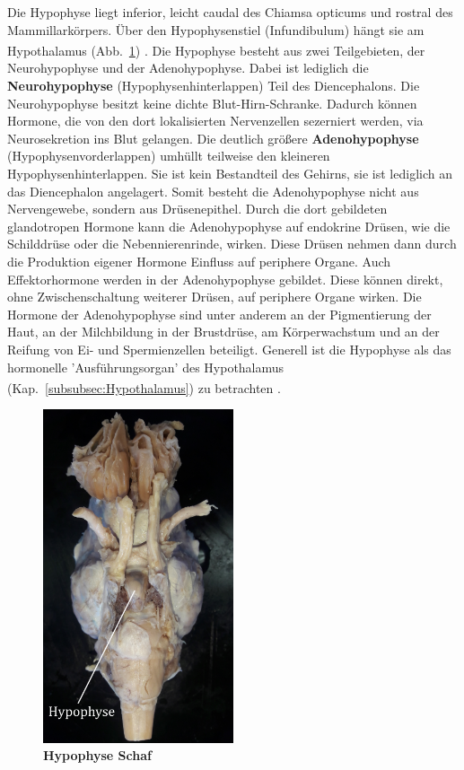 Die Hypophyse liegt inferior, leicht caudal des Chiamsa opticums und rostral des Mammillarkörpers. Über den Hypophysenstiel (Infundibulum) hängt sie am Hypothalamus (Abb.~\ref{fig:hypophyse}) \textsuperscript{\cite[Kap.~4]{trepel2011neuroanatomie}}. Die Hypophyse besteht aus zwei Teilgebieten, der Neurohypophyse und der Adenohypophyse. Dabei ist lediglich die \textbf{Neurohypophyse} (Hypophysenhinterlappen) Teil des Diencephalons. Die Neurohypophyse besitzt keine dichte Blut-Hirn-Schranke. Dadurch können Hormone, die von den dort lokalisierten Nervenzellen sezerniert werden, via Neurosekretion ins Blut gelangen. Die deutlich größere \textbf{Adenohypophyse} (Hypophysenvorderlappen) umhüllt teilweise den kleineren Hypophysenhinterlappen. Sie ist kein Bestandteil des Gehirns, sie ist lediglich an das Diencephalon angelagert. Somit besteht die Adenohypophyse nicht aus Nervengewebe, sondern aus Drüsenepithel. Durch die dort gebildeten glandotropen Hormone kann die Adenohypophyse auf endokrine Drüsen, wie die Schilddrüse oder die Nebennierenrinde, wirken. Diese Drüsen nehmen dann durch die Produktion eigener Hormone  Einfluss auf periphere Organe. Auch Effektorhormone werden in der Adenohypophyse gebildet. Diese können direkt, ohne Zwischenschaltung weiterer Drüsen, auf periphere Organe wirken. Die Hormone der Adenohypophyse sind unter anderem an der Pigmentierung der Haut, an der Milchbildung in der Brustdrüse, am Körperwachstum und an der Reifung von Ei- und Spermienzellen beteiligt. Generell ist die Hypophyse als das hormonelle 'Ausführungsorgan' des Hypothalamus (Kap.~\ref{subsubsec:Hypothalamus}) zu betrachten  \textsuperscript{\cite[Kap.~8]{trepel2011neuroanatomie}}.

\begin{figure}[H]
    \centering
    \includegraphics[width=0.5\textwidth]{pictures/Bilder_Jule/Schaf/Aussenansicht/Hypophyse.png}
    \caption[Hypophyse Schaf]{\textbf{Hypophyse Schaf}}
    \label{fig:hypophyse}
\end{figure}